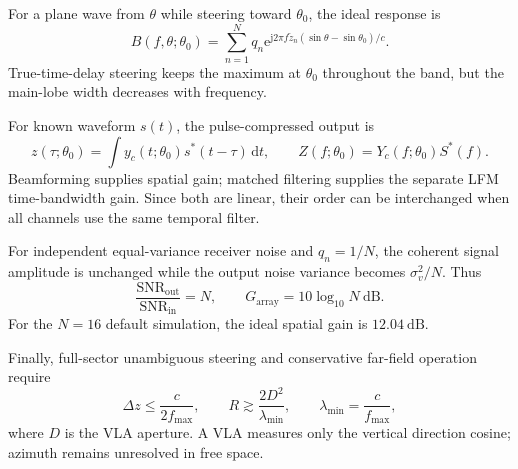 \documentclass[10pt,a4paper]{article}
\newcommand{\jj}{\mathrm{j}}
\newcommand{\e}{\mathrm{e}}
\newcommand{\dd}{\mathrm{d}}
\begin{document}
For a plane wave from $\theta$ while steering toward $\theta_0$, the ideal response is
\begin{equation}
 B(f,\theta;\theta_0)=\sum_{n=1}^{N}q_n
 \e^{\jj2\pi f\widetilde z_n(\sin\theta-\sin\theta_0)/c}.
\end{equation}
True-time-delay steering keeps the maximum at $\theta_0$ throughout the band, but
the main-lobe width decreases with frequency.

For known waveform $s(t)$, the pulse-compressed output is
\begin{equation}
 z(\tau;\theta_0)=\int y_c(t;\theta_0)s^*(t-\tau)\,\dd t,
 \qquad
 Z(f;\theta_0)=Y_c(f;\theta_0)S^*(f).
\end{equation}
Beamforming supplies spatial gain; matched filtering supplies the separate LFM
time-bandwidth gain. Since both are linear, their order can be interchanged when all
channels use the same temporal filter.

For independent equal-variance receiver noise and $q_n=1/N$, the coherent signal
amplitude is unchanged while the output noise variance becomes $\sigma_v^2/N$.
Thus
\begin{equation}
 \frac{\mathrm{SNR}_{\mathrm{out}}}{\mathrm{SNR}_{\mathrm{in}}}=N,
 \qquad G_{\mathrm{array}}=10\log_{10}N\ \mathrm{dB}.
\end{equation}
For the $N=16$ default simulation, the ideal spatial gain is $12.04\ \mathrm{dB}$.

Finally, full-sector unambiguous steering and conservative far-field operation require
\begin{equation}
 \Delta z\leq\frac{c}{2f_{\max}},
 \qquad
 R\gtrsim\frac{2D^2}{\lambda_{\min}},
 \qquad \lambda_{\min}=\frac{c}{f_{\max}},
\end{equation}
where $D$ is the VLA aperture. A VLA measures only the vertical direction cosine;
azimuth remains unresolved in free space.
\end{document}
